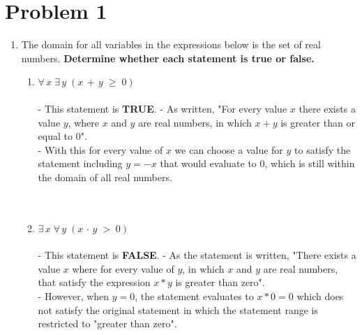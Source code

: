\documentclass{amsart}
\theoremstyle{definition}
\theoremstyle{Exercise}
\theoremstyle{remark}
\theoremstyle{rule}
\numberwithin{equation}{section}
\begin{document}
\section*{Problem 1}
\begin{enumerate}[label=(\alph*)]
\item The domain for all variables in the expressions below is the set of real numbers. {\bf Determine whether each statement is true or false.}
\begin{enumerate}[label=(\roman*)]
  \item $\forall\, x\; \exists \,y\;(x\,+\,y\;\geq \;0)$
\\\\
  - This statement is \textbf{TRUE}. 
  - As written, "For every value $x$ there exists a value $y$, where $x$ and $y$ are real numbers, 
    in which $x+y$ is greater than or equal to $0$".\\
  - With this for every value of $x$ we can choose a value for $y$ to satisfy the statement including $y = -x$ that would evaluate 
    to $0$, which is still within the domain of all real numbers.\\
\\\\
  \item $\exists \, x\; \forall \,y\;(x\,\cdot\,y\;>\; 0)$
   \\\\
  - This statement is \textbf{FALSE}. 
  - As the statement is written, "There exists a value $x$ where for every value of $y$, in which 
    $x$ and $y$ are real numbers, that satisfy the expression $x*y$ is greater than zero".\\
  - However, when $y = 0$, the statement evaluates to $x*0 = 0$ which does not satisfy the original statement in which the statement 
    range is restricted to "greater than zero".\\
\\\\
\end{enumerate}


\end{enumerate}
\end{document}
